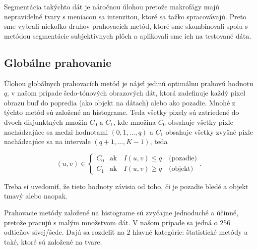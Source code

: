 \documentclass[a4paper,11pt,oneside]{article}%
\begin{document}

Segmentácia takýchto dát je náročnou úlohou pretože makrofágy majú nepravidelné tvary s meniacou sa intenzitou, ktoré sa ťažko spracovávajú. Preto sme vybrali niekoľko druhov prahovacích metód, ktoré sme skombinovali spolu s metódou segmentácie subjektívnych plôch a aplikovali sme ich na testované dáta.

\subsection{Globálne prahovanie}

 Úlohou globálnych prahovacích metód je nájsť jedinú optimálnu prahovú hodnotu $q$, v našom prípade šedo-tónových obrazových dát, ktorá zadefinuje každý pixel obrazu buď do popredia (ako objekt na dátach) alebo ako pozadie. Mnohé z týchto metód sú založené na histograme. Teda všetky pixely sú zatriedené do dvoch disjunktných množín $C_0$ a $C_1$, kde množina $C_0$ obsahuje všetky pixle nachádzajúce sa medzi hodnotami $(0, 1, \dots , q)$ a $C_1$ obsahuje všetky zvyšné pixle nachádzajúce sa na intervale $(q+1, \dots , K-1)$, teda

\begin{equation}
(u, v) \in \begin{cases} C_0 & \text{ak} \hspace{1em} I(u,v) \leq q \hspace{1em} \text{(pozadie)} \\  C_1 & \text{ak} \hspace{1em} I(u,v) \geq q \hspace{1em} \text{(objekt)} \end{cases}.
\end{equation}

Treba si uvedomiť, že tieto hodnoty závisia od toho, či je pozadie bledé a objekt tmavý alebo naopak.

Prahovacie metódy založené na histograme sú zvyčajne jednoduché a účinné, pretože pracujú s malým množstvom dát. V našom prípade sa jedná o 256 odtieňov sivej/šede. Dajú sa rozdeliť na 2 hlavné kategórie: štatistické metódy a také, ktoré sú založené na tvare.
\end{document}
